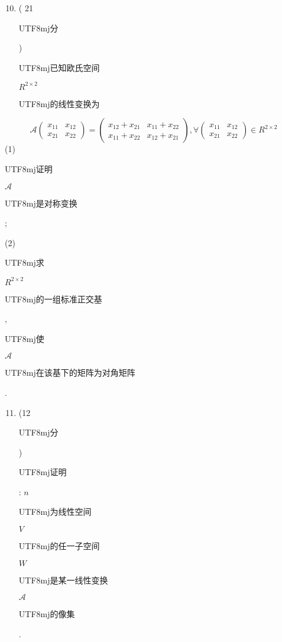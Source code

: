 \documentclass[10pt]{article}
\begin{document}
\begin{enumerate}
  \setcounter{enumi}{9}
  \item ( 21 \begin{CJK}{UTF8}{mj}分\end{CJK}) \begin{CJK}{UTF8}{mj}已知欧氏空间\end{CJK} $R^{2 \times 2}$ \begin{CJK}{UTF8}{mj}的线性变换为\end{CJK}
\end{enumerate}
$$
\mathcal{A}\left(\begin{array}{ll}
x_{11} & x_{12} \\
x_{21} & x_{22}
\end{array}\right)=\left(\begin{array}{ll}
x_{12}+x_{21} & x_{11}+x_{22} \\
x_{11}+x_{22} & x_{12}+x_{21}
\end{array}\right), \forall\left(\begin{array}{ll}
x_{11} & x_{12} \\
x_{21} & x_{22}
\end{array}\right) \in R^{2 \times 2}
$$
(1) \begin{CJK}{UTF8}{mj}证明\end{CJK} $\mathcal{A}$ \begin{CJK}{UTF8}{mj}是对称变换\end{CJK};

(2) \begin{CJK}{UTF8}{mj}求\end{CJK} $R^{2 \times 2}$ \begin{CJK}{UTF8}{mj}的一组标准正交基\end{CJK}, \begin{CJK}{UTF8}{mj}使\end{CJK} $\mathcal{A}$ \begin{CJK}{UTF8}{mj}在该基下的矩阵为对角矩阵\end{CJK}.

\begin{enumerate}
  \setcounter{enumi}{10}
  \item (12 \begin{CJK}{UTF8}{mj}分\end{CJK}) \begin{CJK}{UTF8}{mj}证明\end{CJK}: $n$ \begin{CJK}{UTF8}{mj}为线性空间\end{CJK} $V$ \begin{CJK}{UTF8}{mj}的任一子空间\end{CJK} $W$ \begin{CJK}{UTF8}{mj}是某一线性变换\end{CJK} $\mathcal{A}$ \begin{CJK}{UTF8}{mj}的像集\end{CJK}.
\end{enumerate}
\end{document}
